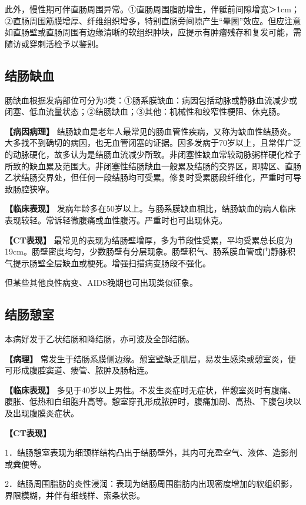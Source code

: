 此外，慢性期可伴直肠周围异常。①直肠周围脂肪增生，伴骶前间隙增宽＞1cm；②直肠周围筋膜增厚、纤维组织增多，特别直肠旁间隙产生“晕圈”效应。但应注意如直肠壁或直肠周围有边缘清晰的软组织肿块，应提示有肿瘤残存和复发可能，需随访或穿刺活检予以鉴别。

\subsection{结肠缺血}

肠缺血根据发病部位可分为3类：①肠系膜缺血：病因包括动脉或静脉血流减少或闭塞、低血流量状态；②结肠缺血；③其他：机械性和绞窄性梗阻、休克肠。

\textbf{【病因病理】}
结肠缺血是老年人最常见的肠血管性疾病，又称为缺血性结肠炎。大多找不到确切的病因，也无血管闭塞的证据。因多发病于70岁以上，且常伴广泛的动脉硬化，故多认为是结肠血流减少所致。非闭塞性缺血常较动脉粥样硬化栓子所致的缺血累及范围大。非闭塞性结肠缺血一般累及结肠的交界区，即脾区、直肠乙状结肠交界处，但任何一段结肠均可受累。修复时受累肠段纤维化，严重时可导致肠腔狭窄。

\textbf{【临床表现】}
发病年龄多在50岁以上。与肠系膜缺血相比，结肠缺血的病人临床表现较轻。常诉轻微腹痛或血性腹泻。严重时也可出现休克。

\textbf{【CT表现】}
最常见的表现为结肠壁增厚，多为节段性受累，平均受累总长度为19cm。肠壁密度均匀，少数肠壁有分层现象。肠壁积气、肠系膜血管或门静脉积气提示肠壁全层缺血或梗死。增强扫描病变肠段不强化。

但某些其他良性病变、AIDS晚期也可出现类似征象。

\subsection{结肠憩室}

本病好发于乙状结肠和降结肠，亦可波及全部结肠。

\textbf{【病理】}
常发生于结肠系膜侧边缘。憩室壁缺乏肌层，易发生感染或憩室炎，便可形成腹腔窦道、瘘管、脓肿及肠粘连。

\textbf{【临床表现】}
多见于40岁以上男性。不发生炎症时无症状，伴憩室炎时有腹痛、腹胀、低热和白细胞升高等。憩室穿孔形成脓肿时，腹痛加剧、高热、下腹包块以及出现腹膜炎症状。

\textbf{【CT表现】}

1．结肠憩室表现为细颈样结构凸出于结肠壁外，其内可充盈空气、液体、造影剂或粪便等。

2．结肠周围脂肪的炎性浸润：表现为结肠周围脂肪内出现密度增加的软组织影，界限模糊，并伴有细线样、索条状影。

